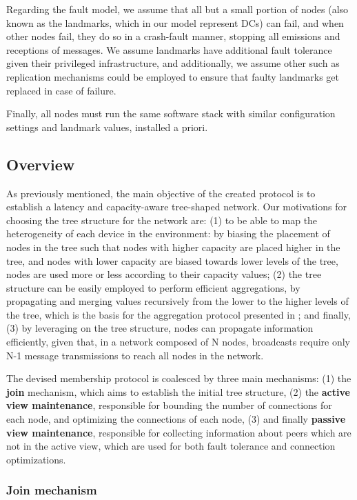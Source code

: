 Regarding the fault model, we assume that all but a small portion of nodes (also known as the landmarks, which in our model represent DCs) can fail, and when other nodes fail, they do so in a crash-fault manner, stopping all emissions and receptions of messages. We assume landmarks have additional fault tolerance given their privileged infrastructure, and additionally, we assume other such as replication \cite{} mechanisms could be employed to ensure that faulty landmarks get replaced in case of failure. 

Finally, all nodes must run the same software stack with similar configuration settings and landmark values, installed a priori.

\subsection{Overview}

As previously mentioned, the main objective of the created protocol is to establish a latency and capacity-aware tree-shaped network. Our motivations for choosing the tree structure for the network are: (1) to be able to map the heterogeneity of each device in the environment: by biasing the placement of nodes in the tree such that nodes with higher capacity are placed higher in the tree, and nodes with lower capacity are biased towards lower levels of the tree, nodes are used more or less according to their capacity values; (2) the tree structure can be easily employed to perform efficient aggregations, by propagating and merging values recursively from the lower to the higher levels of the tree, which is the basis for the aggregation protocol presented in ; and finally, (3) by leveraging on the tree structure, nodes can propagate information efficiently, given that, in a network composed of N nodes, broadcasts require only N-1 message transmissions to reach all nodes in the network. 

The devised membership protocol is coalesced by three main mechanisms: (1) the \textbf{join} mechanism, which aims to establish the initial tree structure, (2) the \textbf{active view maintenance}, responsible for bounding the number of connections for each node, and optimizing the connections of each node, (3)  and finally \textbf{passive view maintenance}, responsible for collecting information about peers which are not in the active view, which are used for both fault tolerance and connection optimizations.

\subsubsection{Join mechanism}

